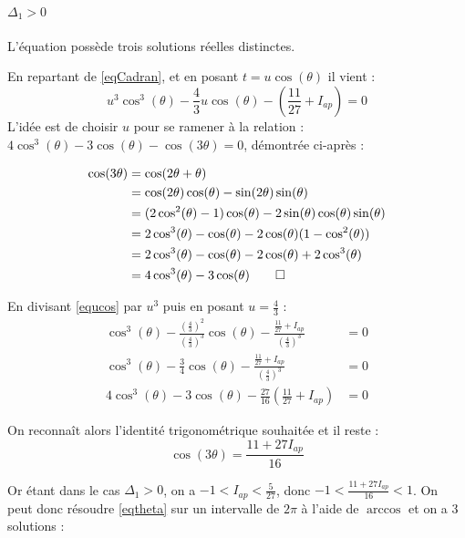 \documentclass[12pt,a4paper,onecolumn]{article}
\begin{document}
\paragraph{$\Delta_1 > 0$} L'équation possède trois solutions réelles distinctes.


En repartant de \ref{eqCadran}, et en posant $t = u\cos(\theta)$ il vient :
\begin{equation}
u^3\cos^3(\theta) -\frac{4}{3}u\cos(\theta)-\left(\frac{11}{27} + I_{ap}\right) = 0
\label{equcos}
\end{equation}
L'idée est de choisir $u$ pour se ramener à la relation :
$ 4\cos^3(\theta) - 3\cos(\theta)-\cos(3\theta) = 0 $, démontrée ci-après :

\begin{align*}
  \cos(3\theta)
  &= \cos(2\theta + \theta)\\
  &= \cos(2\theta)\cos(\theta) - \sin(2\theta)\sin(\theta) \\
  &= (2\cos^2(\theta) - 1)\cos(\theta) - 2\sin(\theta)\cos(\theta)\sin(\theta)\\
  &= 2\cos^3(\theta) - \cos(\theta) - 2\cos(\theta)(1-\cos^2(\theta))\\
  &= 2\cos^3(\theta) - \cos(\theta) - 2\cos(\theta) + 2\cos^3(\theta)\\
  &= 4\cos^3(\theta) - 3\cos(\theta) \qedhere
\end{align*}

En divisant \ref{equcos} par $u^3$ puis en posant $u = \frac{4}{3}$ :
\begin{align*}
\cos^3(\theta) - \frac{\left(\frac{4}{3}\right)^2}{\left(\frac{4}{3}\right)^3}\cos(\theta)-\frac{\frac{11}{27} + I_{ap}}{\left(\frac{4}{3}\right)^3} &= 0 \\
\cos^3(\theta) - \frac{3}{4}\cos(\theta) - \frac{\frac{11}{27} + I_{ap}}{\left(\frac{4}{3}\right)^3}&= 0 \\
4\cos^3(\theta) - 3\cos(\theta) - \frac{27}{16}\left(\frac{11}{27} + I_{ap}\right)&= 0 \tag*{en multipliant par 4}
\end{align*}

On reconnaît alors l'identité trigonométrique souhaitée et il reste :
\begin{equation}
\cos(3\theta) = \frac{11 + 27I_{ap}}{16} \label{eqtheta}
\end{equation}

Or étant dans le cas $\Delta_1 > 0$, on a $-1 < I_{ap} < \frac{5}{27}$, donc $-1 < \frac{11 + 27I_{ap}}{16} < 1$.
On peut donc résoudre \ref{eqtheta} sur un intervalle de $2\pi$ à l'aide de $\arccos$ et on a 3 solutions :
\end{document}

